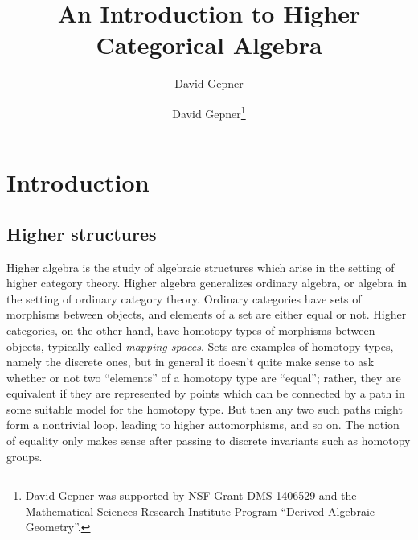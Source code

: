 \documentclass[12pt]{article}
\title{An Introduction to Higher Categorical Algebra}
\author{David Gepner}
\author{David Gepner\thanks{David Gepner was supported by NSF Grant DMS-1406529 and the Mathematical Sciences Research Institute Program ``Derived Algebraic Geometry''.}}
\theoremstyle{definition}
\begin{document}
\maketitle

\tableofcontents


%






\section{Introduction}\label{sec:it}



\subsection{Higher structures}

Higher algebra is the study of algebraic structures which arise in the setting of higher category theory.
Higher algebra generalizes ordinary algebra, or algebra in the setting of ordinary category theory.
Ordinary categories have sets of morphisms between objects, and elements of a set are either equal or not.
Higher categories, on the other hand, have homotopy types of morphisms between objects, typically called {\em mapping spaces}. Sets are examples of homotopy types, namely the discrete ones, but in general it doesn't quite make sense to ask whether or not two ``elements'' of a homotopy type are ``equal''; rather, they are equivalent if they are represented by points which can be connected by a path in some suitable model for the homotopy type. But then any two such paths might form a nontrivial loop, leading to higher automorphisms, and so on.
The notion of equality only makes sense after passing to discrete invariants such as homotopy groups.
\end{document}
